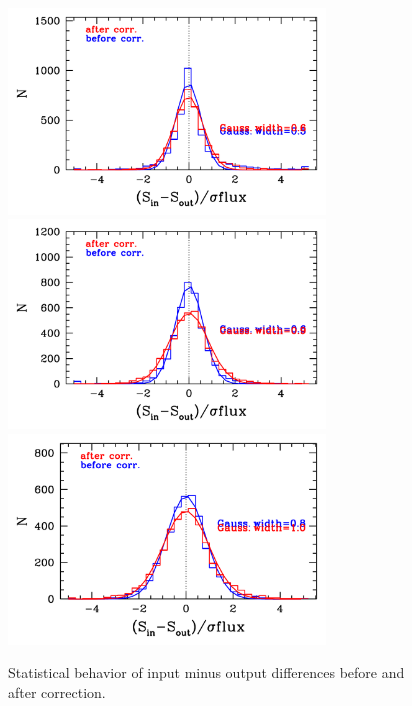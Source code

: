 \documentclass[11pt,a4paper]{article}
\begin{document}
\begin{figure}[H]
	\includegraphics[width=0.75\textwidth]{galsim_20cm_Glenn_hist_dfcorr_1}
	\includegraphics[width=0.75\textwidth]{galsim_20cm_Glenn_hist_dfcorr_2}
	\includegraphics[width=0.75\textwidth]{galsim_20cm_Glenn_hist_dfcorr_3}
	\caption{Statistical behavior of input minus output differences before and after correction.}
\end{figure}



\end{document}

